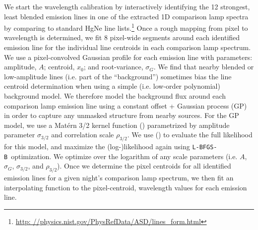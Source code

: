 \documentclass[modern, letterpaper]{aastex61}
\newcommand{\lbfgsb}{\texttt{L-BFGS-B}}
\begin{document}
We start the wavelength calibration by interactively identifying the 12
strongest, least blended emission lines in one of the extracted 1D comparison
lamp spectra by comparing to standard HgNe line lists.\footnote{\url{http:
//physics.nist.gov/PhysRefData/ASD/lines_form.html}}
Once a rough mapping from pixel to wavelength is determined, we fit
8 pixel-wide segments around each identified emission line
for the individual line centroids in each comparison lamp spectrum.
We use a pixel-convolved Gaussian profile for each emission line with
parameters: amplitude, $A$; centroid, $x_0$; and root-variance, $\sigma_G$.
We find that nearby blended or low-amplitude lines (i.e. part of the
``background'') sometimes bias the line centroid determination when using a
simple (i.e. low-order polynomial) background model.
We therefore model the background flux around each comparison lamp emission
line using a constant offset + Gaussian process (GP) in order to capture any
unmasked structure from nearby sources.
For the GP model, we use a Mat\'ern 3/2 kernel function
(\citealt{Matern:1986,Rasmussen:2005}) parametrized by amplitude parameter
$\sigma_{3/2}$ and correlation scale $\rho_{3/2}$.
We use  (\citealt{Foreman-Mackey:2017}) to evaluate the full
likelihood for this model, and maximize the (log-)likelihood again using
\lbfgsb\ optimization.
We optimize over the logarithm of any scale parameters (i.e. $A$, $\sigma_G$,
$\sigma_{3/2}$, and $\rho_{3/2}$).
Once we determine the pixel centroids for all identified emission lines for a
given night's comparison lamp spectrum, we then fit an interpolating function
to the pixel-centroid, wavelength values for each emission line.
\end{document}
